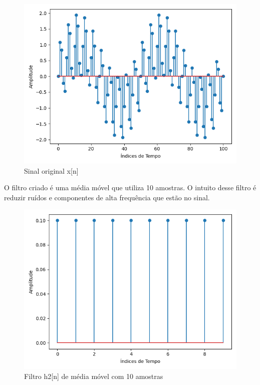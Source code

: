 \begin{figure}[!htb]
    \centering
    \includegraphics[width=\linewidth]{Imagens/fig20.png}
    \caption{Sinal original x[n]}
    \label{fig:graph_20}
\end{figure}

O filtro criado é uma média móvel que utiliza 10 amostras. O intuito desse filtro é reduzir ruídos e componentes de alta frequência que estão no sinal.

\begin{figure}[!htb]
    \centering
    \includegraphics[width=\linewidth]{Imagens/fig21.png}
    \caption{Filtro h2[n] de média móvel com 10 amostras}
    \label{fig:graph_21}
\end{figure}

